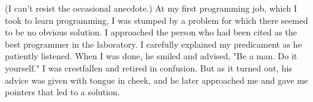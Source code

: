 (I can't resist the occasional anecdote.) At my first programming job, which I took to learn programming, I was stumped by a problem for which there seemed to be no obvious solution. I approached the person who had been cited as the best programmer in the laboratory. I carefully explained my predicament as he patiently listened. When I was done, he smiled and advised, "Be a man. Do it yourself." I was crestfallen and retired in confusion. But as it turned out, his advice was given with tongue in cheek, and he later approached me and gave me pointers that led to a solution. 
